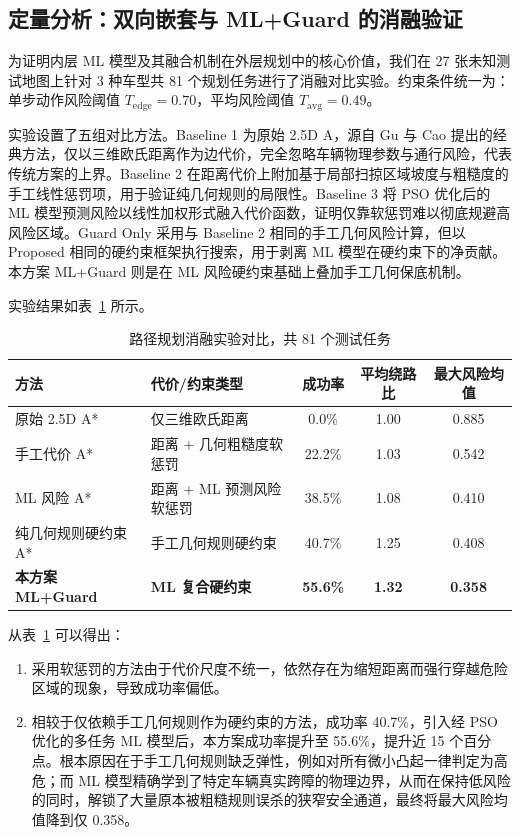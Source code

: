 \documentclass[12pt, a4paper]{article}
\begin{document}
\subsection{定量分析：双向嵌套与 ML+Guard 的消融验证}
为证明内层 ML 模型及其融合机制在外层规划中的核心价值，我们在 27 张未知测试地图上针对 3 种车型共 81 个规划任务进行了消融对比实验。约束条件统一为：单步动作风险阈值 \(T_{\text{edge}}=0.70\)，平均风险阈值 \(T_{\text{avg}}=0.49\)。

实验设置了五组对比方法。Baseline 1 为原始 2.5D A\*，源自 Gu 与 Cao 提出的经典方法\cite{gu2011path}，仅以三维欧氏距离作为边代价，完全忽略车辆物理参数与通行风险，代表传统方案的上界。Baseline 2 在距离代价上附加基于局部扫掠区域坡度与粗糙度的手工线性惩罚项，用于验证纯几何规则的局限性。Baseline 3 将 PSO 优化后的 ML 模型预测风险以线性加权形式融入代价函数，证明仅靠软惩罚难以彻底规避高风险区域。Guard Only 采用与 Baseline 2 相同的手工几何风险计算，但以 Proposed 相同的硬约束框架执行搜索，用于剥离 ML 模型在硬约束下的净贡献。本方案 ML+Guard 则是在 ML 风险硬约束基础上叠加手工几何保底机制。

实验结果如表~\ref{tab:ablation} 所示。

\begin{table}[htbp]
    \centering
    \caption{路径规划消融实验对比，共 81 个测试任务}
    \label{tab:ablation}
    \begin{tabular}{@{} l l c c c @{}}
        \toprule
        \textbf{方法} & \textbf{代价/约束类型} & \textbf{成功率} & \textbf{平均绕路比} & \textbf{最大风险均值} \\
        \midrule
        原始 2.5D A* & 仅三维欧氏距离 & 0.0\% & 1.00 & 0.885 \\
        手工代价 A* & 距离 + 几何粗糙度软惩罚 & 22.2\% & 1.03 & 0.542 \\
        ML 风险 A* & 距离 + ML 预测风险软惩罚 & 38.5\% & 1.08 & 0.410 \\
        纯几何规则硬约束 A* & 手工几何规则硬约束 & 40.7\% & 1.25 & 0.408 \\
        \textbf{本方案 ML+Guard} & \textbf{ML 复合硬约束} & \textbf{55.6\%} & \textbf{1.32} & \textbf{0.358} \\
        \bottomrule
    \end{tabular}
\end{table}

从表~\ref{tab:ablation} 可以得出：

\begin{enumerate}
    \item 采用软惩罚的方法由于代价尺度不统一，依然存在为缩短距离而强行穿越危险区域的现象，导致成功率偏低。
    \item 相较于仅依赖手工几何规则作为硬约束的方法，成功率 40.7\%，引入经 PSO 优化的多任务 ML 模型后，本方案成功率提升至 55.6\%，提升近 15 个百分点。根本原因在于手工几何规则缺乏弹性，例如对所有微小凸起一律判定为高危；而 ML 模型精确学到了特定车辆真实跨障的物理边界，从而在保持低风险的同时，解锁了大量原本被粗糙规则误杀的狭窄安全通道，最终将最大风险均值降到仅 0.358。
\end{enumerate}
\end{document}
